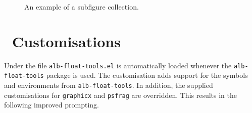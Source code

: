 \documentclass[11pt,a4paper,oneside,titlepage]{alb-corp}
\begin{document}
\begin{description}
\begin{figure}[!t]
\begin{albShelve}[b]
    \end{albShelve}
    \caption[Example subfigure collection]{%
      An example of a subfigure collection.}
    \label{fig:example-subf-coll}
  \end{figure}
\end{description}




\section{\AUCTeX\ Customisations}
\label{sec:alb-float-tools-documentation:auctex-cust}

Under \AUCTeX{} the file \texttt{alb-float-tools.el} is automatically
loaded whenever the \texttt{alb-float-tools} package is used.  The
customisation adds support for the symbols and environments from
\texttt{alb-float-tools}.  In addition, the \AUCTeX{} supplied
customisations for \texttt{graphicx} and \texttt{psfrag} are overridden.
This results in the following improved prompting.
\end{document}
